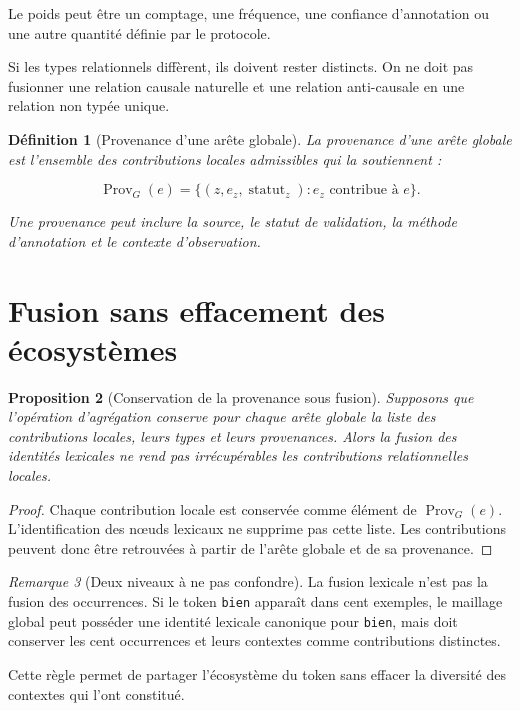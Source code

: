 \documentclass[11pt,a4paper,oneside]{book}
\newtheorem{definition}{Définition}[chapter]
\newtheorem{proposition}[definition]{Proposition}
\theoremstyle{remark}
\newtheorem{remarque}[definition]{Remarque}
\begin{document}
Le poids peut être un comptage, une fréquence, une confiance
d'annotation ou une autre quantité définie par le protocole.

Si les types relationnels diffèrent, ils doivent rester distincts.
On ne doit pas fusionner une relation causale naturelle et une
relation anti-causale en une relation non typée unique.

\begin{definition}[Provenance d'une arête globale]
La provenance d'une arête globale est l'ensemble des contributions
locales admissibles qui la soutiennent :

\[
\operatorname{Prov}_G(e)
=
\{(z,e_z,\operatorname{statut}_z):
e_z\text{ contribue à }e\}.
\]

Une provenance peut inclure la source, le statut de validation,
la méthode d'annotation et le contexte d'observation.
\end{definition}

\section{Fusion sans effacement des écosystèmes}

\begin{proposition}[Conservation de la provenance sous fusion]
Supposons que l'opération d'agrégation conserve pour chaque arête
globale la liste des contributions locales, leurs types et leurs
provenances. Alors la fusion des identités lexicales ne rend pas
irrécupérables les contributions relationnelles locales.

\end{proposition}

\begin{proof}
Chaque contribution locale est conservée comme élément de
\(\operatorname{Prov}_G(e)\). L'identification des nœuds lexicaux
ne supprime pas cette liste. Les contributions peuvent donc être
retrouvées à partir de l'arête globale et de sa provenance.
\end{proof}

\begin{remarque}[Deux niveaux à ne pas confondre]
La fusion lexicale n'est pas la fusion des occurrences. Si le token
\texttt{bien} apparaît dans cent exemples, le maillage global peut
posséder une identité lexicale canonique pour \texttt{bien}, mais
doit conserver les cent occurrences et leurs contextes comme
contributions distinctes.

Cette règle permet de partager l'écosystème du token sans effacer
la diversité des contextes qui l'ont constitué.
\end{remarque}
\end{document}
